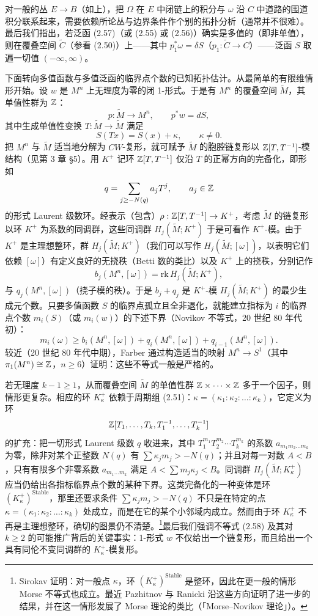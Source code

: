 对一般的丛 $E\to B$（如上），把 $\Omega$ 在 $E$ 中闭链上的积分与 $\omega$ 沿 $C$ 中道路的围道积分联系起来，需要依赖所论丛与边界条件作个别的拓扑分析（通常并不很难）。最后我们指出，若泛函 (2.57)（或 (2.55) 或 (2.56)）确实是多值的（即非单值），则在覆叠空间 $\tilde C$（参看 (2.50)）上——其中 $p_1^*\omega=\delta S$（$p_1:\tilde C\to C$）——泛函 $S$ 取遍一切值 $(-\infty,\infty)$。

下面转向多值函数与多值泛函的临界点个数的已知拓扑估计。从最简单的有限维情形开始。设 $w$ 是 $M^n$ 上无理度为零的闭 1-形式。于是有 $M^n$ 的覆叠空间 $\tilde M$，其单值性群为 $\mathbb{Z}$：
\[
  p:\tilde M\to M^n,\qquad p^*w=dS,
\]
其中生成单值性变换 $T:\tilde M\to\tilde M$ 满足
\[
  S(Tx)=S(x)+\kappa,\qquad\kappa\ne0.
\]
把 $M^n$ 与 $\tilde M$ 适当地分解为 $CW$-复形，就可赋予 $\tilde M$ 的胞腔链复形以 $\mathbb{Z}[T,T^{-1}]$-模结构（见第 3 章 §5）。用 $K^+$ 记环 $\mathbb{Z}[T,T^{-1}]$ 仅沿 $T$ 的正幂方向的完备化，即形如
\[
  q=\sum_{j\ge-N(q)}a_jT^j,\qquad a_j\in\mathbb{Z}
\]
的形式 Laurent 级数环。经表示（包含）$\rho:\mathbb{Z}[T,T^{-1}]\to K^+$，考虑 $\tilde M$ 的链复形以环 $K^+$ 为系数的同调群，这些同调群 $H_j(\tilde M;K^+)$ 于是可看作 $K^+$-模。由于 $K^+$ 是主理想整环，群 $H_j(\tilde M;K^+)$（我们可以写作 $H_j(\tilde M;[\omega])$，以表明它们依赖 $[\omega]$）有定义良好的无挠秩（Betti 数的类比）以及 $K^+$ 上的挠秩，分别记作
\[
  b_j(M^n,[\omega])=\mathrm{rk}\,H_j(\tilde M;K^+),
\]
与 $q_j(M^n,[\omega])$（挠子模的秩）。于是 $b_j+q_j$ 是 $K^+$-模 $H_j(\tilde M;K^+)$ 的最少生成元个数。只要多值函数 $S$ 的临界点孤立且全非退化，就能建立指标为 $i$ 的临界点个数 $m_i(S)$（或 $m_i(w)$）的下述下界（Novikov 不等式，20 世纪 80 年代初）：
\begin{equation}
  m_i(\omega)\ge b_i(M^n,[\omega])+q_i(M^n,[\omega])+q_{i-1}(M^n,[\omega]). \tag{2.58}
\end{equation}
较近（20 世纪 80 年代中期），Farber 通过构造适当的映射 $M^n\to S^1$（其中 $\pi_1(M^n)\cong\mathbb{Z}$，$n\ge6$）证明：这些不等式一般是严格的。

若无理度 $k-1\ge1$，从而覆叠空间 $\tilde M$ 的单值性群 $\mathbb{Z}\times\cdots\times\mathbb{Z}$ 多于一个因子，则情形更复杂。相应的环 $K^+_\kappa$ 依赖于周期组 (2.51)：$\kappa=(\kappa_1:\kappa_2:\dots:\kappa_k)$，它定义为环
\[
  \mathbb{Z}[T_1,\dots,T_k,T_1^{-1},\dots,T_k^{-1}]
\]
的扩充：把一切形式 Laurent 级数 $q$ 收进来，其中 $T_1^{m_1}T_2^{m_2}\cdots T_k^{m_k}$ 的系数 $a_{m_1m_2\dots m_k}$ 为零，除非对某个正整数 $N(q)$ 有 $\sum\kappa_jm_j>-N(q)$；并且对每一对数 $A<B$，只有有限多个非零系数 $a_{m_1\dots m_k}$ 满足 $A<\sum m_j\kappa_j<B$。同调群 $H_j(\tilde M;K^+_\kappa)$ 应当仍给出各指标临界点个数的某种下界。这类完备化的一种变体是环 $(K^+_\kappa)^{\mathrm{Stable}}$，那里还要求条件 $\sum\kappa_jm_j>-N(q)$ 不只是在特定的点 $\kappa=(\kappa_1:\kappa_2:\dots:\kappa_k)$ 处成立，而是在它的某个小邻域内成立。然而由于环 $K^+_\kappa$ 不再是主理想整环，确切的图景仍不清楚。\footnote{Sirokav 证明：对一般点 $\kappa$，环 $(K^+_\kappa)^{\mathrm{Stable}}$ 是整环，因此在更一般的情形 Morse 不等式也成立。最近 Pazhitnov 与 Ranicki 沿这些方向证明了进一步的结果，并在这一情形发展了 Morse 理论的类比（「Morse--Novikov 理论」）。}最后我们强调不等式 (2.58) 及其对 $k\ge2$ 的可能推广背后的关键事实：1-形式 $w$ 不仅给出一个链复形，而且给出一个具有同伦不变同调群的 $K^+_\kappa$-模复形。

